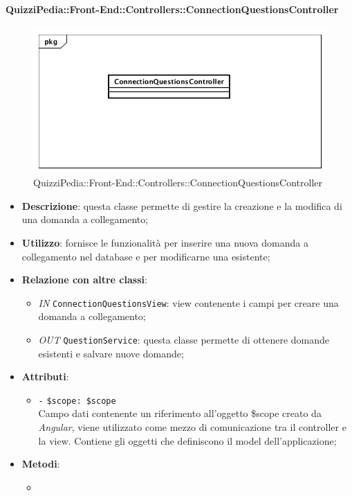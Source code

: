 \paragraph{QuizziPedia::Front-End::Controllers::ConnectionQuestionsController}
\begin{figure} [ht]
	\centering
	\includegraphics[scale=0.45]{UML/Classi/Front-End/QuizziPedia_Front-end_Controller_ConnectionQuestionsController.png}
	\caption{QuizziPedia::Front-End::Controllers::ConnectionQuestionsController}
\end{figure} \FloatBarrier
\begin{itemize}
	\item \textbf{Descrizione}: questa classe permette di gestire la creazione e la modifica di una domanda a collegamento;
	\item \textbf{Utilizzo}: fornisce le funzionalità per inserire una nuova domanda a collegamento nel database e per modificarne una esistente;
	\item \textbf{Relazione con altre classi}:
	\begin{itemize}
		\item \textit{IN} \texttt{ConnectionQuestionsView}: view contenente i campi per creare una domanda a collegamento;  
		\item \textit{OUT} \texttt{QuestionService}: questa classe permette di ottenere domande esistenti e salvare nuove domande;
	\end{itemize}
	\item \textbf{Attributi}:
	\begin{itemize}
		\item \texttt{-} \texttt{\$scope: \$scope} \\
		Campo dati contenente un riferimento all’oggetto \$scope creato da \textit{Angular}, viene utilizzato come mezzo di comunicazione tra il controller e la view. Contiene gli oggetti che definiscono il model dell’applicazione;
	\end{itemize}
	\item \textbf{Metodi}:
	\begin{itemize}
		\item 
	\end{itemize}
\end{itemize}

